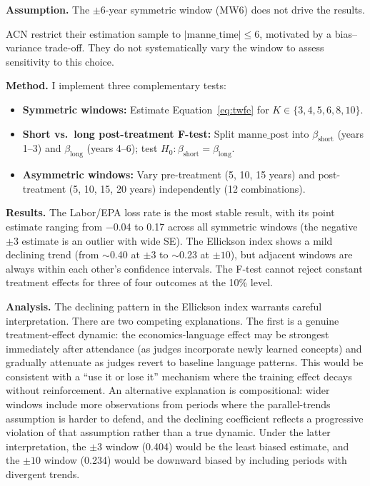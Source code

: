 \documentclass[12pt,a4paper]{article}
\begin{document}
\textbf{Assumption.} The $\pm 6$-year symmetric window (MW6) does not drive the results.

ACN restrict their estimation sample to $|\text{manne\_time}| \leq 6$, motivated by a bias--variance trade-off. They do not systematically vary the window to assess sensitivity to this choice.

\textbf{Method.} I implement three complementary tests:
\begin{itemize}[nosep]
    \item \textbf{Symmetric windows:} Estimate Equation~\ref{eq:twfe} for $K \in \{3,4,5,6,8,10\}$.
    \item \textbf{Short vs.\ long post-treatment F-test:} Split $\text{manne\_post}$ into $\beta_{\text{short}}$ (years 1--3) and $\beta_{\text{long}}$ (years 4--6); test $H_0: \beta_{\text{short}} = \beta_{\text{long}}$.
    \item \textbf{Asymmetric windows:} Vary pre-treatment (5, 10, 15 years) and post-treatment (5, 10, 15, 20 years) independently (12 combinations).
\end{itemize}

\textbf{Results.} The Labor/EPA loss rate is the most stable result, with its point estimate ranging from $-$0.04 to 0.17 across all symmetric windows (the negative $\pm 3$ estimate is an outlier with wide SE). The Ellickson index shows a mild declining trend (from $\sim$0.40 at $\pm 3$ to $\sim$0.23 at $\pm 10$), but adjacent windows are always within each other's confidence intervals. The F-test cannot reject constant treatment effects for three of four outcomes at the 10\% level.

\textbf{Analysis.} The declining pattern in the Ellickson index warrants careful interpretation. There are two competing explanations. The first is a genuine treatment-effect dynamic: the economics-language effect may be strongest immediately after attendance (as judges incorporate newly learned concepts) and gradually attenuate as judges revert to baseline language patterns. This would be consistent with a ``use it or lose it'' mechanism where the training effect decays without reinforcement. An alternative explanation is compositional: wider windows include more observations from periods where the parallel-trends assumption is harder to defend, and the declining coefficient reflects a progressive violation of that assumption rather than a true dynamic. Under the latter interpretation, the $\pm 3$ window (0.404) would be the least biased estimate, and the $\pm 10$ window (0.234) would be downward biased by including periods with divergent trends.
\end{document}
